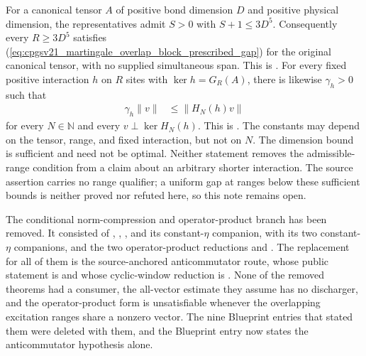 \documentclass{article}
\begin{document}
For a canonical tensor $A$ of positive bond dimension $D$ and positive
physical dimension, the representatives admit $S>0$ with $S+1\leq3D^5$.
Consequently every $R\geq3D^5$ satisfies
(\ref{eq:cpgsv21_martingale_overlap_block_prescribed_gap}) for the original
canonical tensor, with no supplied simultaneous span. This is
.
For every fixed positive interaction $h$ on $R$ sites with $\ker h=G_R(A)$,
there is likewise $\gamma_h>0$ such that
\begin{align}
    \gamma_h\lVert v\rVert
      &\leq\lVert H_N(h)v\rVert
    \label{eq:cpgsv21_martingale_overlap_canonical_positive_gap}
\end{align}
for every $N\in\mathbb N$ and every $v\perp\ker H_N(h)$. This is
.
The constants may depend on the tensor, range, and fixed interaction, but not
on $N$. The dimension bound is sufficient and need not be optimal. Neither
statement removes the admissible-range condition from a claim about an
arbitrary shorter interaction. The source assertion carries no range
qualifier; a uniform gap at ranges below these sufficient bounds is neither
proved nor refuted here, so this note remains open.

The conditional norm-compression and operator-product branch has been
removed.  It consisted of
,
,
,
and its constant-$\eta$ companion,
with its two constant-$\eta$ companions, and the two operator-product
reductions
and
.
The replacement for all of them is the source-anchored anticommutator route,
whose public statement is
 and whose
cyclic-window reduction is
.
None of the removed theorems had a consumer, the all-vector estimate they
assume has no discharger, and the operator-product form is unsatisfiable
whenever the overlapping excitation ranges share a nonzero vector.  The nine
Blueprint entries that stated them were deleted with them, and the Blueprint
entry  now states the anticommutator
hypothesis alone.
\end{document}
